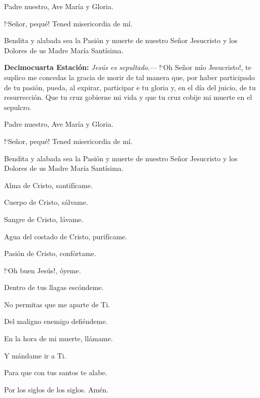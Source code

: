 \documentclass[10pt]{article}
\begin{document}
\begin{multicols}{2}
      \vspace{2mm}

      Padre nuestro, Ave María y Gloria.

      {!`}Señor, pequé! Tened misericordia de mí.

      Bendita y alabada sea la Pasión y muerte de nuestro Señor Jesucristo y los Dolores de us Madre María Santísima.

      \vspace{2mm}

      \textbf{Decimocuarta Estación:} \textit{Jesús es sepultado}.--- {!`}Oh Señor mío Jesucristo!, te suplico me concedas la gracia de morir de tal manera que, por haber participado de tu pasión,
      pueda, al expirar, participar e tu gloria y, en el día del juicio, de tu resurrección. Que tu cruz gobierne mi vida y que tu cruz cobije mi muerte en el sepulcro.

      \vspace{2mm}

      Padre nuestro, Ave María y Gloria.

      {!`}Señor, pequé! Tened misericordia de mí.

      Bendita y alabada sea la Pasión y muerte de nuestro Señor Jesucristo y los Dolores de us Madre María Santísima.

      \vspace{2mm}

      Alma de Cristo, santifícame.

      Cuerpo de Cristo, sálvame.

      Sangre de Cristo, lávame.

      Agua del costado de Cristo, purifícame.

      Pasión de Cristo, confórtame.

      {!`}Oh buen Jesús!, óyeme.

      Dentro de tus llagas escóndeme.
      
      No permitas que me aparte de Ti.

      Del maligno enemigo defiéndeme.

      En la hora de mi muerte, llámame.

      Y mándame ir a Ti.

      Para que con tus santos te alabe.

      Por los siglos de los siglos. Amén.





\end{multicols}
\end{document}
